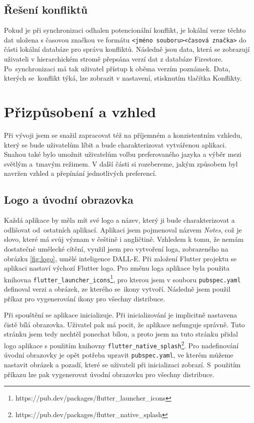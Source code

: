 \documentclass[czech, bc, kiv, he, iso690numb]{fasthesis}
\begin{document}
\subsection{Řešení konfliktů}

Pokud je při synchronizaci odhalen potencionální konflikt, je lokální verze těchto dat uložena s časovou značkou ve formátu \texttt{<jméno souboru><časová značka>} do části lokální databáze pro správu konfliktů. Následně jsou data, která se zobrazují uživateli v hierarchickém stromě přepsána verzí dat z databáze Firestore. Po~synchronizaci má tak uživatel přístup k oběma verzím poznámek. Data, kterých se~konflikt týká, lze zobrazit v nastavení, stisknutím tlačítka Konflikty.    

\section{Přizpůsobení a vzhled}

Při vývoji jsem se snažil zapracovat též na příjemném a konzistentním vzhledu, který se bude uživatelům líbit a bude charakterizovat vytvářenou aplikaci. Snahou také bylo umožnit uživatelům volbu preferovaného jazyka a výběr mezi světlým a~tmavým režimem. V další části si rozebereme, jakým způsobem byl navržen vzhled a přepínání jednotlivých preferencí.

\subsection{Logo a úvodní obrazovka}

Každá aplikace by měla mít své logo a název, který ji bude charakterizovat a odlišovat od~ostatních aplikací. Aplikaci jsem pojmenoval názvem \textit{Notes}, což je slovo, které má svůj význam v češtině i angličtině. Vzhledem k tomu, že nemám dostatečné umělecké cítění, využil jsem pro vytvoření loga, zobrazeného na obrázku \ref{fig:logo}, umělé inteligence DALL-E. Při založení Flutter projektu se aplikaci nastaví výchozí Flutter logo. Pro změnu loga aplikace byla použita knihovna \texttt{flutter\_launcher\_icons}\footnote{https://pub.dev/packages/flutter\_launcher\_icons}, pro kterou jsem v souboru \texttt{pubspec.yaml} definoval verzi a obrázek, ze kterého se~ikony vytvoří. Následně jsem použil příkaz pro vygenerování ikony pro všechny distribuce.

Při spouštění se aplikace inicializuje. Při inicializování je implicitně nastavena čistě bílá obrazovka. Uživatel pak má pocit, že aplikace nefunguje správně. Tuto stránku jsem tedy nechtěl ponechat bílou, a proto jsem na tuto stránku přidal logo aplikace s použitím knihovny \texttt{flutter\_native\_splash}\footnote{https://pub.dev/packages/flutter\_native\_splash}. Pro nadefinování úvodní obrazovky je opět potřeba upravit \texttt{pubspec.yaml}, ve kterém můžeme nastavit obrázek a pozadí, které se uživateli při inicializaci zobrazí. S~použitím příkazu lze pak vygenerovat úvodní obrazovku pro všechny distribuce.
\end{document}
